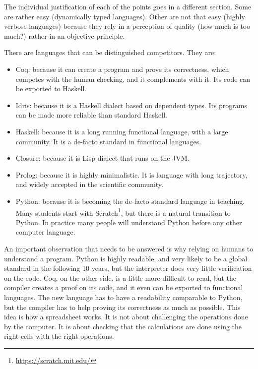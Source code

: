 {    The individual justification of each of the points goes in a different section.
    Some are rather easy (dynamically typed languages). Other are not that easy (highly verbose languages) because they rely in a perception of quality (how much is too much?) rather in an objective principle.

    There are languages that can be distinguished competitors.
    They are:
    \begin{itemize}
        \item Coq: because it can create a program and prove its correctness, which competes with the human checking, and it complements with it. Its code can be exported to Haskell.
        \item Idris: because it is a Haskell dialect based on dependent types. Its programs can be made more reliable than standard Haskell.
        \item Haskell: because it is a long running functional language, with a large community. It is a de-facto standard in functional languages.
        \item Closure: because it is Lisp dialect that runs on the JVM.
        \item Prolog: because it is highly minimalistic. It is language with long trajectory, and widely accepted in the scientific community.
        \item Python: because it is becoming the de-facto standard language in teaching. Many students start with Scratch\footnote{\url{https://scratch.mit.edu/}}, but there is a natural transition to Python. In practice many people will understand Python before any other computer language.
    \end{itemize}

    An important observation that needs to be answered is why relying on humans to understand a program.
    Python is highly readable, and very likely to be a global standard in the following 10 years, but the interpreter does very little verification on the code.
    Coq, on the other side, is a little more difficult to read, but the compiler creates a proof on its code, and it even can be exported to functional languages.
    The new language has to have a readability comparable to Python, but the compiler has to help proving its correctness as much as possible.
    This idea is how a spreadsheet works.
    It is not about challenging the operations done by the computer.
    It is about checking that the calculations are done using the right cells with the right operations.
}

